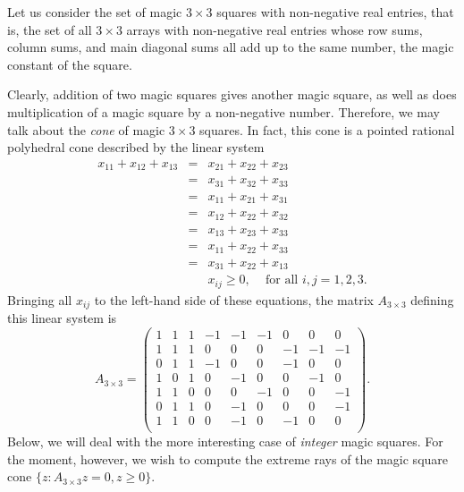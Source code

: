 Let us consider the set of magic $3\times 3$ squares with
non-negative real entries, that is, the set of all $3\times 3$
arrays with non-negative real entries whose row sums, column sums,
and main diagonal sums all add up to the same number, the magic
constant of the square. \vspace{-0.3cm}
\begin{center}
  
\end{center}
\vspace{-0.4cm} Clearly, addition of two magic squares gives another
magic square, as well as does multiplication of a magic square by a
non-negative number. Therefore, we may talk about the \emph{cone} of
magic $3\times 3$ squares. In fact, this cone is a pointed rational
polyhedral cone described by the linear system
\begin{eqnarray*}
x_{11}+x_{12}+x_{13}
& = & x_{21}+x_{22}+x_{23}\\
& = & x_{31}+x_{32}+x_{33}\\
& = & x_{11}+x_{21}+x_{31}\\
& = & x_{12}+x_{22}+x_{32}\\
& = & x_{13}+x_{23}+x_{33}\\
& = & x_{11}+x_{22}+x_{33}\\
& = & x_{31}+x_{22}+x_{13}\\
&   & x_{ij} \geq 0,\;\;\; \text{ for all } i,j=1,2,3.
\end{eqnarray*}
Bringing all $x_{ij}$ to the left-hand side of these equations, the
matrix $A_{3\times 3}$ defining this linear system is
\[
A_{3\times 3}=\left(
\begin{array}{rrrrrrrrr}
1 & 1 & 1 & -1 & -1 & -1 &  0 &  0 &  0\\
1 & 1 & 1 &  0 &  0 &  0 & -1 & -1 & -1\\
0 & 1 & 1 & -1 &  0 &  0 & -1 &  0 &  0\\
1 & 0 & 1 &  0 & -1 &  0 &  0 & -1 &  0\\
1 & 1 & 0 &  0 &  0 & -1 &  0 &  0 & -1\\
0 & 1 & 1 &  0 & -1 &  0 &  0 &  0 & -1\\
1 & 1 & 0 &  0 & -1 &  0 & -1 &  0 &  0\\
\end{array}
\right).
\]
Below, we will deal with the more interesting case of \emph{integer} magic
squares. For the moment, however, we wish to compute the extreme rays
of the magic square cone $\{z:A_{3\times 3}z=0,z\geq 0\}$.

